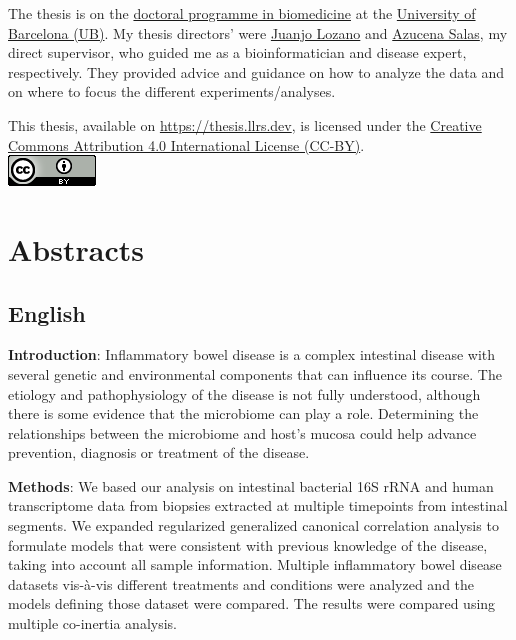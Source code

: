 \documentclass[
  12pt,
  a4paper,
  twoside,
  openright]{book}
\begin{document}
The thesis is on the \href{https://www.ub.edu/doctorat_biomedicina/eng/index.htm}{doctoral programme in biomedicine} at the \href{https://www.ub.edu/web/portal/en/}{University of Barcelona (UB)}.
My thesis directors' were \href{https://orcid.org/0000-0001-7613-3908}{Juanjo Lozano} and \href{https://orcid.org/0000-0003-4572-2907}{Azucena Salas}, my direct supervisor, who guided me as a bioinformatician and disease expert, respectively.
They provided advice and guidance on how to analyze the data and on where to focus the different experiments/analyses.

This thesis, available on \url{https://thesis.llrs.dev}, is licensed under the \href{https://creativecommons.org/licenses/by/4.0/}{Creative Commons Attribution 4.0 International License (CC-BY)}.\\
\includegraphics{images/by.png}

\hypertarget{abstracts}{%
\chapter*{Abstracts}\label{abstracts}}

\hypertarget{english}{%
\section*{English}\label{english}}

\textbf{Introduction}: Inflammatory bowel disease is a complex intestinal disease with several genetic and environmental components that can influence its course.
The etiology and pathophysiology of the disease is not fully understood, although there is some evidence that the microbiome can play a role.
Determining the relationships between the microbiome and host's mucosa could help advance prevention, diagnosis or treatment of the disease.

\textbf{Methods}: We based our analysis on intestinal bacterial 16S rRNA and human transcriptome data from biopsies extracted at multiple timepoints from intestinal segments.
We expanded regularized generalized canonical correlation analysis to formulate models that were consistent with previous knowledge of the disease, taking into account all sample information.
Multiple inflammatory bowel disease datasets vis-à-vis different treatments and conditions were analyzed and the models defining those dataset were compared.
The results were compared using multiple co-inertia analysis.
\end{document}
